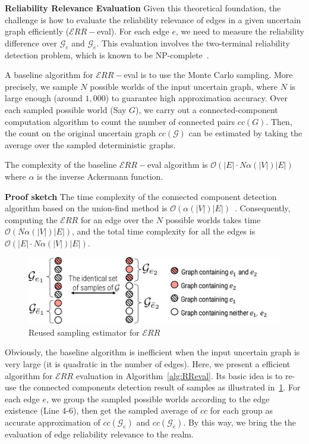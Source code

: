 \textbf{Reliability Relevance Evaluation}
Given this theoretical foundation, the challenge is how to evaluate the reliability relevance of edges in  a given uncertain graph efficiently ($\mathcal{E}RR-$eval). 
For each edge $e$, we need to measure the reliability difference over $\mathcal{G}_{e}$ and $\mathcal{G}_{\bar{e}}$. 
This evaluation involves the two-terminal reliability detection problem, which is known to be NP-complete~\cite{MOBall}.   


A baseline algorithm for $\mathcal{E}RR-$eval is to use the
Monte Carlo sampling. More precisely, we sample $N$ possible
worlds of the input uncertain graph, where $N$ is large enough (around $1,000$) to guarantee high approximation accuracy. 
Over each sampled possible world (Say $G$), we carry out a connected-component computation algorithm to count 
the number of connected pairs $cc(G)$. Then, the count on the original uncertain graph $cc(\mathcal{G})$ can be estimated by taking the average over the sampled deterministic graphs. 

\begin{theorem}
	The complexity of the baseline $\mathcal{E}RR-$eval algorithm is $\mathcal{O} (|E| \cdot  N \alpha(|V|) |E| )$ where $\alpha$ is the inverse Ackermann function.  
\end{theorem}

{\bf Proof sketch} The time complexity of the connected component detection algorithm based on the union-find method is $\mathcal{O}(\alpha(|V|) |E|)$~\cite{Wredman:1989:CPC:73007.73040}. Consequently, computing the $\mathcal{E}RR$ for an edge over the $N$ possible worlds takes time $\mathcal{O}(N \alpha(|V|) |E|)$, and the total time complexity for all the edges is $\mathcal{O} (|E| \cdot  N \alpha(|V|) |E|)$. 


\begin{figure}
	\centering
    \includegraphics[width=1\linewidth]{ill/rrEval.pdf}
    \vspace{-1em}
    \caption{\small Reused sampling estimator for $\mathcal{E}RR$ }
    \label{fig:rrEval}
\end{figure}
Obviously, the baseline algorithm is inefficient when the input uncertain graph is very large (it is quadratic in the number of edges). Here, we present a efficient algorithm for $\mathcal{E}RR$ evaluation in Algorithm~\ref{alg:RReval}. Its basic idea is to re-use the connected components detection result of samples as illustrated in~\ref{fig:rrEval}. For each edge $e$, we group the sampled possible worlds according to the edge existence (Line 4-6), then get the sampled average of $cc$ for each group as accurate approximation of $cc(\mathcal{G}_{e})$ and $cc(\mathcal{G}_{\bar{e}})$. By this way, we bring the the evaluation of edge reliability relevance to the realm.  


